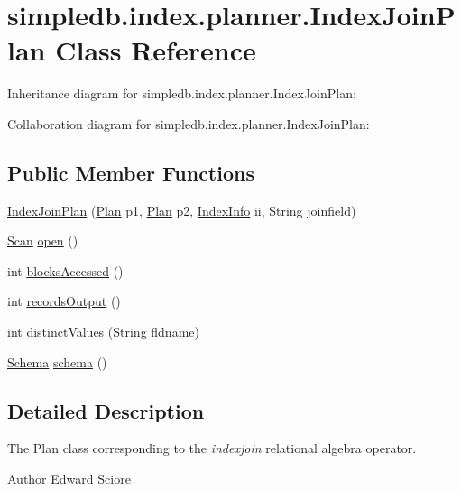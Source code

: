 \hypertarget{classsimpledb_1_1index_1_1planner_1_1IndexJoinPlan}{}\section{simpledb.\+index.\+planner.\+Index\+Join\+Plan Class Reference}
\label{classsimpledb_1_1index_1_1planner_1_1IndexJoinPlan}


Inheritance diagram for simpledb.\+index.\+planner.\+Index\+Join\+Plan\+:


Collaboration diagram for simpledb.\+index.\+planner.\+Index\+Join\+Plan\+:
\subsection*{Public Member Functions}
\begin{DoxyCompactItemize}
\item 
\hyperlink{classsimpledb_1_1index_1_1planner_1_1IndexJoinPlan_a3bd27083a88b0ea50256d9d9906367fb}{Index\+Join\+Plan} (\hyperlink{interfacesimpledb_1_1plan_1_1Plan}{Plan} p1, \hyperlink{interfacesimpledb_1_1plan_1_1Plan}{Plan} p2, \hyperlink{classsimpledb_1_1metadata_1_1IndexInfo}{Index\+Info} ii, String joinfield)
\item 
\hyperlink{interfacesimpledb_1_1query_1_1Scan}{Scan} \hyperlink{classsimpledb_1_1index_1_1planner_1_1IndexJoinPlan_ab9c7fc729baa00380ee1a314578f5828}{open} ()
\item 
int \hyperlink{classsimpledb_1_1index_1_1planner_1_1IndexJoinPlan_a6189cff464c671000c394b56616e4f89}{blocks\+Accessed} ()
\item 
int \hyperlink{classsimpledb_1_1index_1_1planner_1_1IndexJoinPlan_a885b5d4ff1b8b96353d58a87417e6f5f}{records\+Output} ()
\item 
int \hyperlink{classsimpledb_1_1index_1_1planner_1_1IndexJoinPlan_a91f22c04a47d5bc2385eeadd9b270ac5}{distinct\+Values} (String fldname)
\item 
\hyperlink{classsimpledb_1_1record_1_1Schema}{Schema} \hyperlink{classsimpledb_1_1index_1_1planner_1_1IndexJoinPlan_a4dcc700748306498294974d01a5f78fd}{schema} ()
\end{DoxyCompactItemize}


\subsection{Detailed Description}
The Plan class corresponding to the {\itshape indexjoin} relational algebra operator. \begin{DoxyAuthor}{Author}
Edward Sciore 
\end{DoxyAuthor}


